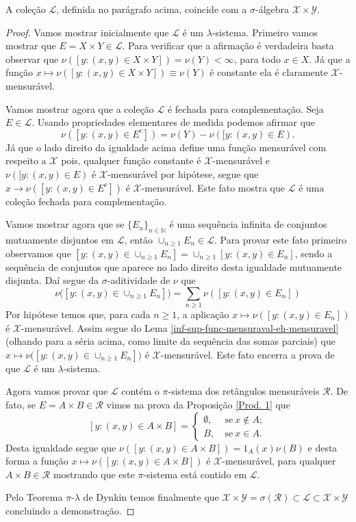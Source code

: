 \begin{proposicao}\label{Mens. Prod}
A coleção $\mathscr{L}$, definida no parágrafo acima, 
coincide com a $\sigma$-álgebra  $\mathscr{X}\times \mathscr{Y}$.
\end{proposicao}
\begin{proof}
Vamos mostrar inicialmente que $\mathscr{L}$ 
é um $\lambda$-sistema. 
Primeiro vamos mostrar que $E=X\times Y\in \mathscr{L}$.
Para verificar que a afirmação é verdadeira 
basta observar que $\nu([y:(x,y)\in X\times Y])=\nu(Y) < \infty$, 
para todo $x\in X$. Já que a função 
$x\mapsto \nu([y:(x,y)\in X\times Y])\equiv \nu(Y)$ 
é constante ela é claramente $\mathscr{X}$-mensurável.

Vamos mostrar agora que a coleção $\mathscr{L}$ é fechada 
para complementação. Seja $E\in \mathscr{L}$.
Usando propriedades elementares de medida 
podemos afirmar que 
\[ 
\nu( [y:(x,y)\in E^c] )=\nu(Y)-\nu([y:(x,y)\in E).
\]
Já que o lado direito da igualdade acima 
define uma função mensurável com 
respeito a $\mathscr{X}$ pois,  
qualquer função constante é $\mathscr{X}$-mensurável
e $\nu([y:(x,y)\in E)$ é $\mathscr{X}$-mensurável por hipótese,
segue que $x\to \nu( [y:(x,y)\in E^c] )$ é $\mathscr{X}$-mensurável. 
Este fato mostra que $\mathscr{L}$ é uma coleção fechada para complementação.

Vamos mostrar agora que se $\{ E_n \}_{n\in\mathbb{N}}$ 
é uma sequência infinita de conjuntos mutuamente disjuntos em $\mathscr{L}$,
então $\cup_{n\geq 1} E_n\in \mathscr{L}$. 
Para provar este fato primeiro observamos que 
$
[y:(x,y)\in \cup_{n\geq 1}E_n ] 
= 
\cup_{n \geq 1}  
[y:(x,y)\in E_n ]
$, sendo a sequência de conjuntos que aparece no lado direito
desta igualdade mutuamente disjunta.  
Daí segue da $\sigma$-aditividade de $\nu$ que
\[
\nu \big( [y:(x,y)\in \cup_{n\geq 1}E_n ] \big)
= 
\sum_{n \geq 1}  
\nu ([y:(x,y)\in E_n ])
\]
Por hipótese temos que, para cada $n\geq 1$, 
a aplicação $x\mapsto \nu ([y:(x,y)\in E_n ])$ 
é $\mathscr{X}$-mensurável. 
Assim segue do Lema \ref{inf-sup-func-mensuraval-eh-mensuravel} 
(olhando para a séria acima, como limite da sequência das somas parciais) 
que $x\mapsto \nu \big( [y:(x,y)\in \cup_{n\geq 1}E_n ] \big)$ é 
$\mathscr{X}$-mensurável. 
Este fato encerra a prova de que $\mathscr{L}$ é um $\lambda$-sistema.
 
Agora vamos provar que $\mathscr{L}$ contém o $\pi$-sistema 
dos retângulos mensuráveis $\mathscr{R}$. 
De fato, se $E=A\times B\in \mathscr{R}$ 
vimos na prova da Proposição \ref{Prod. 1} que 
\[
[y:(x,y)\in A\times B ]
=
\begin{cases}
\emptyset,&\ \text{se}\ x\notin A;
\\
B,&\ \text{se}\ x\in A. 
\end{cases}
\] 
Desta igualdade segue que
$\nu([y:(x,y)\in A\times B ]) = 1_A(x)\nu(B)$ 
e desta forma a função $x\mapsto \nu([y:(x,y)\in A\times B ])$ 
é $\mathscr{X}$-mensurável, para qualquer $A\times B\in\mathscr{R}$
mostrando que este $\pi$-sistema está contido em $\mathscr{L}$. 

Pelo Teorema $\pi$-$\lambda$ de Dynkin 
temos finalmente que $\mathscr{X}\times \mathscr{Y}= \sigma(\mathscr{R})\subset \mathscr{L}\subset \mathscr{X}\times \mathscr{Y}$ concluindo a demonstração.
\end{proof}
